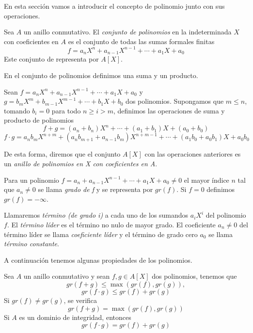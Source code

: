 En esta sección vamos a introducir el concepto de polinomio junto con sus operaciones.

\begin{definition}
    Sea $A$ un anillo conmutativo. El \emph{conjunto de polinomios} en la indeterminada $X$ con coeficientes en $A$ es el conjunto de 
    todas las sumas formales finitas
    $$f = a_n X^n + a_{n-1} X^{n-1} + \cdots + a_1 X + a_0$$
    Este conjunto de representa por $A[X]$.
\end{definition}

En el conjunto de polinomios definimos una suma y un producto. 

Sean $f = a_n X^n + a_{n-1} X^{n-1} + \cdots + a_1 X + a_0$ y $g = b_m X^m + b_{m-1} X^{m-1} + \cdots + b_1 X + b_0$
dos polinomios. Supongamos que $m \leq n$, tomando $b_i = 0$ para todo $n \geq i > m$, definimos las operaciones de suma y producto de polinomios
$$f + g = (a_n + b_n)X^n + \cdots + (a_1 + b_1)X + (a_0 + b_0)$$
$$f \cdot g = a_n b_m X^{n+m} + (a_n b_{m+1} + a_{n-1} b_m) X^{n+m-1} + \cdots + (a_1 b_0 + a_0 b_1)X + a_0 b_0$$

De esta forma, diremos que el conjunto $A[X]$ con las operaciones anteriores es un \emph{anillo de polinomios en X con coeficientes en A}.

\begin{definition}
    Para un polinomio $f = a_n + a_{n-1} X^{n-1} + \cdots + a_1 X + a_0 \neq 0$ el mayor índice $n$ tal que $a_n \neq 0$ se llama \emph{grado de f}
    y se representa por $gr(f)$. Si $f = 0$ definimos $gr(f) = - \infty$.

    Llamaremos \emph{término (de grado i)} a cada uno de los sumandos $a_i X^i$ del polinomio $f$. El \emph{término líder}
    es el término no nulo de mayor grado. El coeficiente $a_n \neq 0$ del término líder se llama \emph{coeficiente líder} 
    y el término de grado cero $a_0$ se llama \emph{término constante}.
\end{definition}

A continuación tenemos algunas propiedades de los polinomios.

\begin{proposition}
    Sea $A$ un anillo conmutativo y sean $f,g \in A[X]$ dos polinomios, tenemos que 
    $$gr(f + g) \leq \max{(gr(f), gr(g))},$$
    $$gr(f \cdot g) \leq gr(f) + gr(g)$$
    Si $gr(f) \neq gr(g)$, se verifica 
    $$gr(f + g) = \max{(gr(f), gr(g))}$$
    Si $A$ es un dominio de integridad, entonces
    $$gr(f \cdot g) = gr(f) + gr(g)$$
\end{proposition}

